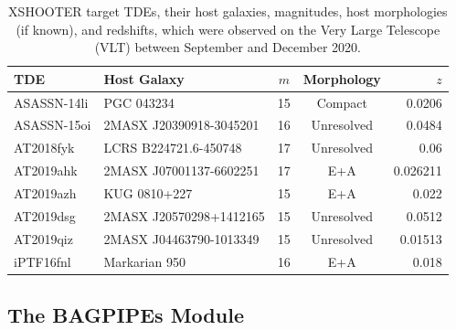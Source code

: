 \documentclass[a4paper,11pt]{article}
\begin{document}
\lipsum[1]

\begin{table}[H]
  \centering
  \begin{tabular}{l l c c r}
    TDE         & Host Galaxy             & $m$ & Morphology & $z$      \\
    \hline \hline
    ASASSN-14li & PGC 043234              & 15  & Compact    & 0.0206   \\
    ASASSN-15oi & 2MASX J20390918-3045201 & 16  & Unresolved & 0.0484   \\
    AT2018fyk   & LCRS B224721.6-450748   & 17  & Unresolved & 0.06     \\
    AT2019ahk   & 2MASX J07001137-6602251 & 17  & E+A        & 0.026211 \\
    AT2019azh   & KUG 0810+227            & 15  & E+A        & 0.022    \\
    AT2019dsg   & 2MASX J20570298+1412165 & 15  & Unresolved & 0.0512   \\
    AT2019qiz   & 2MASX J04463790-1013349 & 15  & Unresolved & 0.01513  \\
    iPTF16fnl   & Markarian 950           & 16  & E+A        & 0.018    \\
    \hline
  \end{tabular}
  \caption{XSHOOTER target TDEs, their host galaxies, magnitudes, host morphologies (if known), and redshifts, which were observed on the Very Large Telescope (VLT) between September and December 2020.\cite{Zwicky_1975, Jose_2014, Holoien_2016a, Arcavi_2015, Holoien_2016b, Wevers_2021, Cacella_2019, Holoien_2019, van_Velzen_2019, Perez_Torres_2019, Seibert_2019, Gezari_2016, Blagorodnova_2017}}
  \label{tab:xshooter_data}
\end{table}

\subsection{The BAGPIPEs Module}\label{sec:bagpipes_module}
\end{document}
